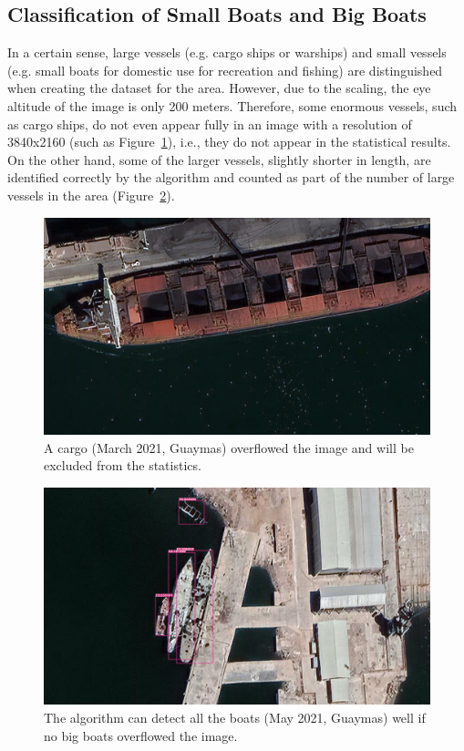 \newpage
\subsection{Classification of Small Boats and Big Boats}
In a certain sense, large vessels (e.g. cargo ships or warships) and small vessels (e.g. small boats for domestic use for recreation and fishing) are distinguished when creating the dataset for the area. However, due to the scaling, the eye altitude of the image is only 200 meters. Therefore, some enormous vessels, such as cargo ships, do not even appear fully in an image with a resolution of 3840x2160 (such as Figure~\ref{fig:Guaymas_202103_overflow_screen}), i.e., they do not appear in the statistical results. On the other hand, some of the larger vessels, slightly shorter in length, are identified correctly by the algorithm and counted as part of the number of large vessels in the area (Figure~\ref{fig:Guaymas_202105_detect_small_large}).

\begin{figure}
    \centering
    \includegraphics[scale=0.11]{img/Guaymas_202103_overflow_screen.jpg}
    \caption{A cargo (March 2021, Guaymas) overflowed the image and will be excluded from the statistics.}
    \label{fig:Guaymas_202103_overflow_screen}
\end{figure}


\begin{figure}
    \centering
    \includegraphics[scale=0.11]{img/Guaymas_202105_detect_small_large.jpg}
    \caption{The algorithm can detect all the boats (May 2021, Guaymas) well if no big boats overflowed the image.}
    \label{fig:Guaymas_202105_detect_small_large}
\end{figure}




